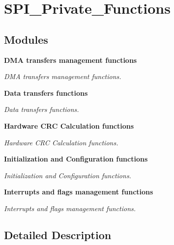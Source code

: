 \section{S\+P\+I\+\_\+\+Private\+\_\+\+Functions}
\label{group__SPI__Private__Functions}
\subsection*{Modules}
\begin{DoxyCompactItemize}
\item 
\textbf{ D\+M\+A transfers management functions}
\begin{DoxyCompactList}\small\item\em D\+MA transfers management functions. \end{DoxyCompactList}\item 
\textbf{ Data transfers functions}
\begin{DoxyCompactList}\small\item\em Data transfers functions. \end{DoxyCompactList}\item 
\textbf{ Hardware C\+R\+C Calculation functions}
\begin{DoxyCompactList}\small\item\em Hardware C\+RC Calculation functions. \end{DoxyCompactList}\item 
\textbf{ Initialization and Configuration functions}
\begin{DoxyCompactList}\small\item\em Initialization and Configuration functions. \end{DoxyCompactList}\item 
\textbf{ Interrupts and flags management functions}
\begin{DoxyCompactList}\small\item\em Interrupts and flags management functions. \end{DoxyCompactList}\end{DoxyCompactItemize}


\subsection{Detailed Description}
